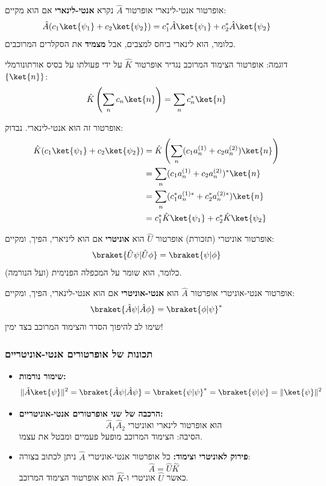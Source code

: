 \begin{definitionbox}{אופרטור אנטי-לינארי}
אופרטור $\hat{A}$ נקרא \textbf{אנטי-לינארי} אם הוא מקיים:
\[
\hat{A}(c_1\ket{\psi_1} + c_2\ket{\psi_2}) = c_1^*\hat{A}\ket{\psi_1} + c_2^*\hat{A}\ket{\psi_2}
\]
כלומר, הוא לינארי ביחס למצבים, אבל \textbf{מצמיד} את הסקלרים המרוכבים.
\end{definitionbox}

\begin{examplebox}{דוגמה: אופרטור הצימוד המרוכב}
נגדיר אופרטור $\hat{K}$ על ידי פעולתו על בסיס אורתונורמלי $\{\ket{n}\}$:
\[
\hat{K}\left(\sum_{n} c_n\ket{n}\right) = \sum_{n} c_n^*\ket{n}
\]

אופרטור זה הוא אנטי-לינארי. נבדוק:
\begin{align*}
\hat{K}(c_1\ket{\psi_1} + c_2\ket{\psi_2}) &= \hat{K}\left(\sum_n (c_1 a_n^{(1)} + c_2 a_n^{(2)})\ket{n}\right) \\
&= \sum_n (c_1 a_n^{(1)} + c_2 a_n^{(2)})^*\ket{n} \\
&= \sum_n (c_1^* a_n^{(1)*} + c_2^* a_n^{(2)*})\ket{n} \\
&= c_1^* \hat{K}\ket{\psi_1} + c_2^* \hat{K}\ket{\psi_2}
\end{align*}
\end{examplebox}

\begin{definitionbox}{אופרטור אוניטרי (תזכורת)}
אופרטור $\hat{U}$ הוא \textbf{אוניטרי} אם הוא ליניארי, הפיך, ומקיים:
\[
\braket{\hat{U}\psi|\hat{U}\phi} = \braket{\psi|\phi}
\]
כלומר, הוא שומר על המכפלה הפנימית (ועל הנורמה).
\end{definitionbox}

\begin{definitionbox}{אופרטור אנטי-אוניטרי}
אופרטור $\hat{A}$ הוא \textbf{אנטי-אוניטרי} אם הוא אנטי-לינארי, הפיך, ומקיים:
\[
\braket{\hat{A}\psi|\hat{A}\phi} = \braket{\phi|\psi}^*
\]
שימו לב להיפוך הסדר והצימוד המרוכב בצד ימין!
\end{definitionbox}

\subsubsection*{תכונות של אופרטורים אנטי-אוניטריים}

\begin{itemize}
    \item \textbf{שימור נורמות:} 
    \[
    \|\hat{A}\ket{\psi}\|^2 = \braket{\hat{A}\psi|\hat{A}\psi} = \braket{\psi|\psi}^* = \braket{\psi|\psi} = \|\ket{\psi}\|^2
    \]
    
    \item \textbf{הרכבה של שני אופרטורים אנטי-אוניטריים:}
    \[
    \hat{A}_1\hat{A}_2 \text{ הוא אופרטור לינארי ואוניטרי}
    \]
    הסיבה: הצימוד המרוכב מופעל פעמיים ומבטל את עצמו.
    
    \item \textbf{פירוק לאוניטרי וצימוד:} כל אופרטור אנטי-אוניטרי $\hat{A}$ ניתן לכתוב בצורה:
    \[
    \hat{A} = \hat{U}\hat{K}
    \]
    כאשר $\hat{U}$ אוניטרי ו-$\hat{K}$ הוא אופרטור הצימוד המרוכב.
\end{itemize}

